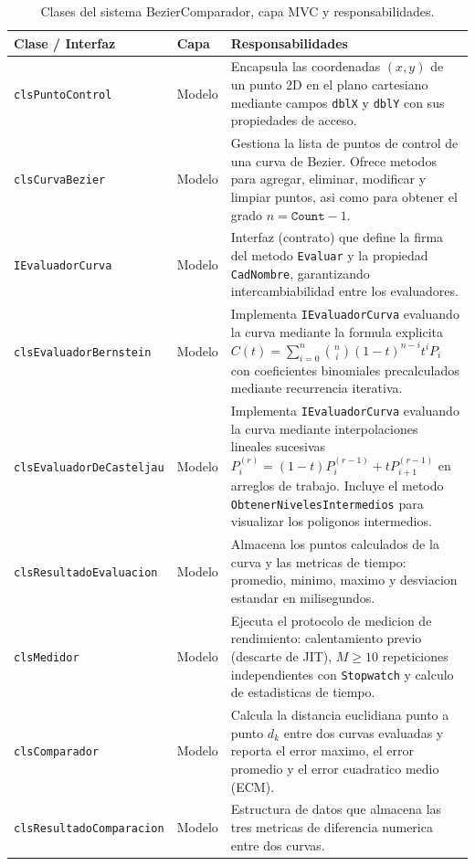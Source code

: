 \begin{table}[H]
\centering
\caption{Clases del sistema BezierComparador, capa MVC y responsabilidades.}
\label{tab:impl_clases}
\footnotesize
\begin{tabular}{p{3.5cm} l p{8.5cm}}
\toprule
\textbf{Clase / Interfaz} & \textbf{Capa} & \textbf{Responsabilidades} \\
\midrule
\texttt{clsPuntoControl} & Modelo & Encapsula las coordenadas $(x, y)$ de un punto 2D en el plano cartesiano mediante campos \texttt{dblX} y \texttt{dblY} con sus propiedades de acceso. \\
\midrule
\texttt{clsCurvaBezier} & Modelo & Gestiona la lista de puntos de control de una curva de Bezier. Ofrece metodos para agregar, eliminar, modificar y limpiar puntos, asi como para obtener el grado $n = \texttt{Count} - 1$. \\
\midrule
\texttt{IEvaluadorCurva} & Modelo & Interfaz (contrato) que define la firma del metodo \texttt{Evaluar} y la propiedad \texttt{CadNombre}, garantizando intercambiabilidad entre los evaluadores. \\
\midrule
\texttt{clsEvaluadorBernstein} & Modelo & Implementa \texttt{IEvaluadorCurva} evaluando la curva mediante la formula explicita $C(t) = \sum_{i=0}^{n} \binom{n}{i}(1-t)^{n-i}t^i P_i$ con coeficientes binomiales precalculados mediante recurrencia iterativa. \\
\midrule
\texttt{clsEvaluadorDeCasteljau} & Modelo & Implementa \texttt{IEvaluadorCurva} evaluando la curva mediante interpolaciones lineales sucesivas $P_i^{(r)} = (1-t)P_i^{(r-1)} + tP_{i+1}^{(r-1)}$ en arreglos de trabajo. Incluye el metodo \texttt{ObtenerNivelesIntermedios} para visualizar los poligonos intermedios. \\
\midrule
\texttt{clsResultadoEvaluacion} & Modelo & Almacena los puntos calculados de la curva y las metricas de tiempo: promedio, minimo, maximo y desviacion estandar en milisegundos. \\
\midrule
\texttt{clsMedidor} & Modelo & Ejecuta el protocolo de medicion de rendimiento: calentamiento previo (descarte de JIT), $M \ge 10$ repeticiones independientes con \texttt{Stopwatch} y calculo de estadisticas de tiempo. \\
\midrule
\texttt{clsComparador} & Modelo & Calcula la distancia euclidiana punto a punto $d_k$ entre dos curvas evaluadas y reporta el error maximo, el error promedio y el error cuadratico medio (ECM). \\
\midrule
\texttt{clsResultadoComparacion} & Modelo & Estructura de datos que almacena las tres metricas de diferencia numerica entre dos curvas. \\

\end{tabular}
\end{table}
